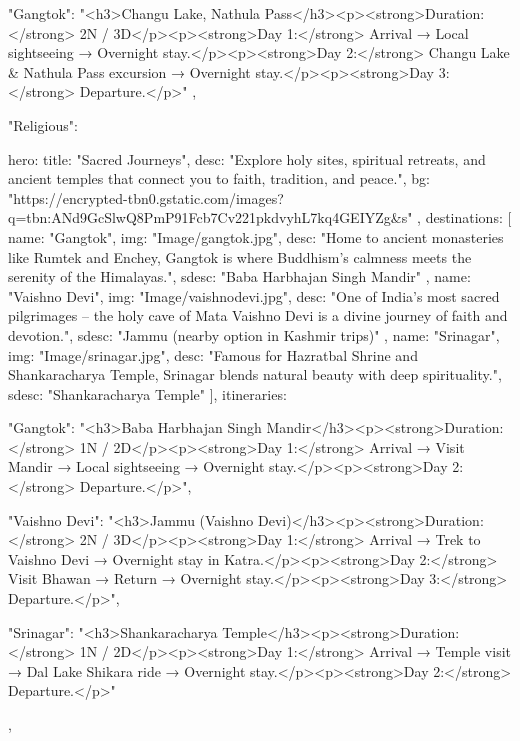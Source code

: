 {{{    "Gangtok": "<h3>Changu Lake, Nathula Pass</h3><p><strong>Duration:</strong> 2N / 3D</p><p><strong>Day 1:</strong> Arrival → Local sightseeing → Overnight stay.</p><p><strong>Day 2:</strong> Changu Lake & Nathula Pass excursion → Overnight stay.</p><p><strong>Day 3:</strong> Departure.</p>"
  }
},


"Religious": {
  hero: {
    title: "Sacred Journeys",
    desc: "Explore holy sites, spiritual retreats, and ancient temples that connect you to faith, tradition, and peace.",
    bg: "https://encrypted-tbn0.gstatic.com/images?q=tbn:ANd9GcSlwQ8PmP91Fcb7Cv221pkdvyhL7kq4GEIYZg&s"
  },
  destinations: [
    { 
      name: "Gangtok", 
      img: "Image/gangtok.jpg", 
      desc: "Home to ancient monasteries like Rumtek and Enchey, Gangtok is where Buddhism’s calmness meets the serenity of the Himalayas.", 
      sdesc: "Baba Harbhajan Singh Mandir" 
    },
    { 
      name: "Vaishno Devi", 
      img: "Image/vaishnodevi.jpg", 
      desc: "One of India’s most sacred pilgrimages – the holy cave of Mata Vaishno Devi is a divine journey of faith and devotion.", 
      sdesc: "Jammu (nearby option in Kashmir trips)" 
    },
    { 
      name: "Srinagar", 
      img: "Image/srinagar.jpg", 
      desc: "Famous for Hazratbal Shrine and Shankaracharya Temple, Srinagar blends natural beauty with deep spirituality.", 
      sdesc: "Shankaracharya Temple" 
    }
  ],
  itineraries: {
    "Gangtok": "<h3>Baba Harbhajan Singh Mandir</h3><p><strong>Duration:</strong> 1N / 2D</p><p><strong>Day 1:</strong> Arrival → Visit Mandir → Local sightseeing → Overnight stay.</p><p><strong>Day 2:</strong> Departure.</p>",

    "Vaishno Devi": "<h3>Jammu (Vaishno Devi)</h3><p><strong>Duration:</strong> 2N / 3D</p><p><strong>Day 1:</strong> Arrival → Trek to Vaishno Devi → Overnight stay in Katra.</p><p><strong>Day 2:</strong> Visit Bhawan → Return → Overnight stay.</p><p><strong>Day 3:</strong> Departure.</p>",

    "Srinagar": "<h3>Shankaracharya Temple</h3><p><strong>Duration:</strong> 1N / 2D</p><p><strong>Day 1:</strong> Arrival → Temple visit → Dal Lake Shikara ride → Overnight stay.</p><p><strong>Day 2:</strong> Departure.</p>"
  }
},

}
